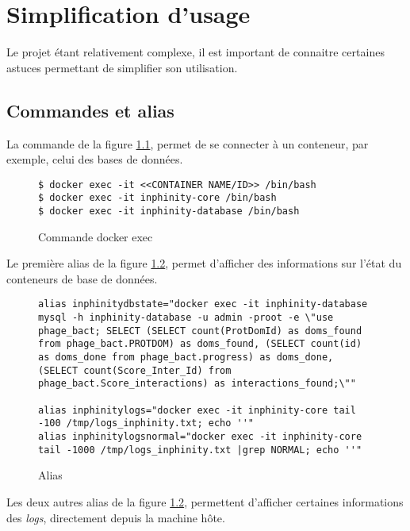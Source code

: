 \chapter{Simplification d'usage}
\label{ch:simple}

Le projet étant relativement complexe, il est important de connaitre certaines astuces permettant de simplifier son utilisation.

\section{Commandes et alias}

La commande de la figure \ref{fig:cmdDockerExec}, permet de se connecter à un conteneur, par exemple, celui des bases de données.

\begin{figure}[H] 
\centering 
\begin{lstlisting}[frame=single]
$ docker exec -it <<CONTAINER NAME/ID>> /bin/bash
$ docker exec -it inphinity-core /bin/bash
$ docker exec -it inphinity-database /bin/bash
\end{lstlisting} 
\caption[Code - Commande docker exec]{Commande docker exec}
\label{fig:cmdDockerExec} 
\end{figure}

Le première alias de la figure \ref{fig:aliases}, permet d'afficher des informations sur l'état du conteneurs de base de données.

\begin{figure}[H] 
\centering 
\begin{lstlisting}[frame=single]
alias inphinitydbstate="docker exec -it inphinity-database mysql -h inphinity-database -u admin -proot -e \"use phage_bact; SELECT (SELECT count(ProtDomId) as doms_found from phage_bact.PROTDOM) as doms_found, (SELECT count(id) as doms_done from phage_bact.progress) as doms_done, (SELECT count(Score_Inter_Id) from phage_bact.Score_interactions) as interactions_found;\""

alias inphinitylogs="docker exec -it inphinity-core tail -100 /tmp/logs_inphinity.txt; echo ''"
alias inphinitylogsnormal="docker exec -it inphinity-core tail -1000 /tmp/logs_inphinity.txt |grep NORMAL; echo ''"
\end{lstlisting} 
\caption[Code - Alias]{Alias}
\label{fig:aliases} 
\end{figure}

Les deux autres alias de la figure \ref{fig:aliases}, permettent d'afficher certaines informations des \emph{logs}, directement depuis la machine hôte.

